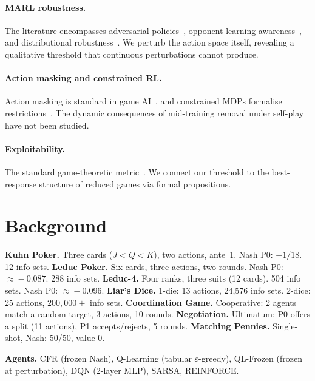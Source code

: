 \documentclass[sigconf,anonymous]{acmart}
\begin{document}
\paragraph{MARL robustness.}
The literature encompasses adversarial policies~\cite{gleave2020adversarial}, opponent-learning awareness~\cite{foerster2018learning}, and distributional robustness~\cite{zhang2021multi}. We perturb the action space itself, revealing a qualitative threshold that continuous perturbations cannot produce.

\paragraph{Action masking and constrained RL.}
Action masking is standard in game AI~\cite{huang2022closer}, and constrained MDPs formalise restrictions~\cite{altman1999constrained}. The dynamic consequences of mid-training removal under self-play have not been studied.

\paragraph{Exploitability.}
The standard game-theoretic metric~\cite{johanson2007computing,timbers2022approximate}. We connect our threshold to the best-response structure of reduced games via formal propositions.

\section{Background}

\textbf{Kuhn Poker.} Three cards ($J\!<\!Q\!<\!K$), two actions, ante~1. Nash P0: $-1/18$. 12 info sets.
\textbf{Leduc Poker.} Six cards, three actions, two rounds. Nash P0: $\approx\!-0.087$. 288 info sets.
\textbf{Leduc-4.} Four ranks, three suits (12 cards). 504 info sets. Nash P0: $\approx\!-0.096$.
\textbf{Liar's Dice.} 1-die: 13 actions, 24{,}576 info sets. 2-dice: 25 actions, $200{,}000{+}$ info sets.
\textbf{Coordination Game.} Cooperative: 2 agents match a random target, 3 actions, 10 rounds.
\textbf{Negotiation.} Ultimatum: P0 offers a split (11 actions), P1 accepts/rejects, 5 rounds.
\textbf{Matching Pennies.} Single-shot, Nash: 50/50, value 0.

\textbf{Agents.} CFR (frozen Nash), Q-Learning (tabular $\varepsilon$-greedy), QL-Frozen (frozen at perturbation), DQN (2-layer MLP), SARSA, REINFORCE.
\end{document}
